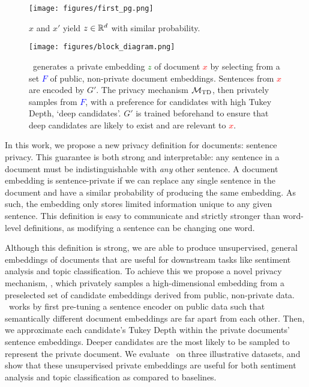 \begin{figure}
	\centering
	\texttt{[image: figures/first\_pg.png]}
	\label{fig:first page}
	\vspace{0cm}
	\caption{$x$ and $x'$ yield $z \in {\mathbb R}^d$ with similar probability.}
\end{figure}
 
\begin{figure*}
	\centering
	\vspace{-1cm}
	\texttt{[image: figures/block\_diagram.png]}
	\label{fig:block diagram}
	\vspace{-0.65cm}
	\caption{\technique\ generates a private embedding \textcolor{green}{$z$} of document \textcolor{red}{$x$} by selecting from a set \textcolor{blue}{$F$} of public, non-private document embeddings. Sentences from \textcolor{red}{$x$} are encoded by $G'$. The privacy mechanism $\mathcal{M}_{\text{TD}}$, then privately samples from \textcolor{blue}{$F$}, with a preference for candidates with high Tukey Depth, `deep candidates'. $G'$ is trained beforehand to ensure that deep candidates are likely to exist and are relevant to \textcolor{red}{$x$}.}
\end{figure*}

In this work, we propose a new privacy definition for documents: sentence privacy. This guarantee is both strong and interpretable: any sentence in a document must be indistinguishable with \emph{any} other sentence. A document embedding is sentence-private if we can replace any single sentence in the document and have a similar probability of producing the same embedding. As such, the embedding only stores limited information unique to any given sentence. This definition is easy to communicate and strictly stronger than word-level definitions, as modifying a sentence can be changing one word.

Although this definition is strong, we are able to produce unsupervised, general embeddings of documents that are useful for downstream tasks like sentiment analysis and topic classification. To achieve this we propose a novel privacy mechanism, \technique, which privately samples a high-dimensional embedding from a preselected set of candidate embeddings derived from public, non-private data. \technique\  works by first pre-tuning a sentence encoder on public data such that semantically different document embeddings are far apart from each other. Then, we approximate each candidate's Tukey Depth within the private documents' sentence embeddings. Deeper candidates are the most likely to be sampled to represent the private document. We evaluate \technique\  on three illustrative datasets, and show that these unsupervised private embeddings are useful for both sentiment analysis and topic classification as compared to baselines. 

